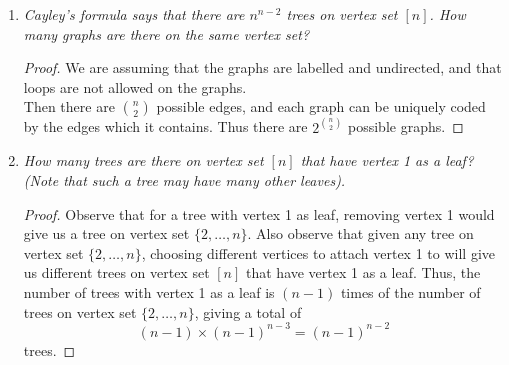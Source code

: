 \documentclass{article}
\begin{document}
\begin{enumerate}[label={\bf Q\arabic*:}]
\begin{proof}
      (d)$\Rightarrow$(c): Assume (d) holds but the graph $G$ is not
      connected. Then $G$ is the disjoint union of finitely many connected
      subgraphs, each being acyclic since $G$ is acyclic. Then from (e) and
      the equivalence of (e) with (c), the number of edges of each subgraph
      is one less than its number of vertices. Then $G$ would have $n-k$
      edges, where $k$ is the number of disjoint subgraphs. This
      contradicts $G$ having $n-1$ edges.
    \end{proof}

  \item \it Cayley's formula says that there are $n^{n-2}$ trees on vertex
    set $[n]$. How many graphs are there on the same vertex set?

    \begin{proof}
      We are assuming that the graphs are labelled and undirected, and that
      loops are not allowed on the graphs. \\

      Then there are $\binom{n}{2}$ possible edges, and each graph can be
      uniquely coded by the edges which it contains. Thus there are
      $2^{\binom{n}{2}}$ possible graphs.
    \end{proof}

  \item \it How many trees are there on vertex set $[n]$ that have vertex 1
    as a leaf? (Note that such a tree may have many other leaves).

    \begin{proof}
      Observe that for a tree with vertex 1 as leaf, removing vertex 1
      would give us a tree on vertex set $\{2,\ldots,n\}$. Also observe
      that given any tree on vertex set $\{2,\ldots,n\}$, choosing
      different vertices to attach vertex 1 to will give us different trees
      on vertex set $[n]$ that have vertex 1 as a leaf. Thus, the number of
      trees with vertex 1 as a leaf is $(n-1)$ times of the number of trees
      on vertex set $\{2,\ldots,n\}$, giving a total of
      \[(n-1)\times(n-1)^{n-3} = (n-1)^{n-2}\]
      trees.
    \end{proof}
\end{enumerate}
\end{document}
